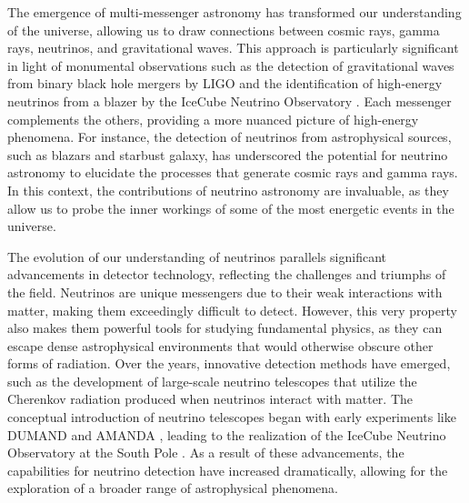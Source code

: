 The emergence of multi-messenger astronomy has transformed our understanding of the universe, allowing us to draw connections between cosmic rays, gamma rays, neutrinos, and gravitational waves. This approach is particularly significant in light of monumental observations such as the detection of gravitational waves from binary black hole mergers by LIGO  and the identification of high-energy neutrinos from a blazer by the IceCube Neutrino Observatory . Each messenger complements the others, providing a more nuanced picture of high-energy phenomena. For instance, the detection of neutrinos from astrophysical sources, such as blazars and starbust galaxy, has underscored the potential for neutrino astronomy to elucidate the processes that generate cosmic rays and gamma rays. In this context, the contributions of neutrino astronomy are invaluable, as they allow us to probe the inner workings of some of the most energetic events in the universe.

The evolution of our understanding of neutrinos parallels significant advancements in detector technology, reflecting the challenges and triumphs of the field. Neutrinos are unique messengers due to their weak interactions with matter, making them exceedingly difficult to detect. However, this very property also makes them powerful tools for studying fundamental physics, as they can escape dense astrophysical environments that would otherwise obscure other forms of radiation. Over the years, innovative detection methods have emerged, such as the development of large-scale neutrino telescopes that utilize the Cherenkov radiation produced when neutrinos interact with matter. The conceptual introduction of neutrino telescopes began with early experiments like DUMAND  and AMANDA , leading to the realization of the IceCube Neutrino Observatory at the South Pole . As a result of these advancements, the capabilities for neutrino detection have increased dramatically, allowing for the exploration of a broader range of astrophysical phenomena.

